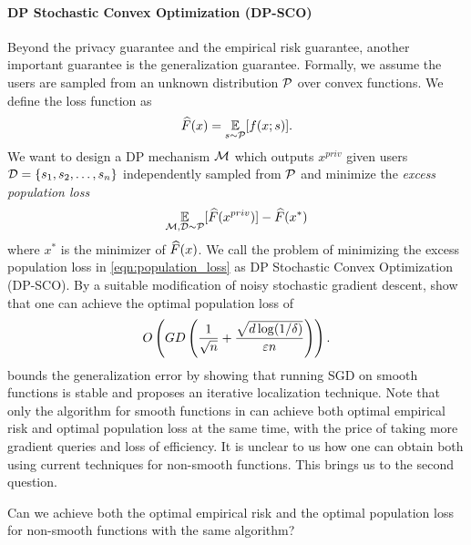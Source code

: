 \paragraph{DP Stochastic Convex Optimization (DP-SCO)} Beyond the privacy guarantee and the empirical risk guarantee, another important guarantee is the generalization guarantee. Formally, we assume the users are sampled from an unknown distribution $\mathcal P$ over convex functions. We define the loss function as
\begin{align}
\label{eq:DPSCO}
    \widehat{F}(x)=\operatorname*{\mathbb{E}}_{s\sim \mathcal P}[f(x;s)].
\end{align}
We want to design a DP mechanism $\mathcal M$ which outputs $x^{priv}$ given users $\mathcal D = \{s_1,s_2,\dots,s_n\}$ independently sampled from $\mathcal P$ and minimize the \emph{excess population loss}
\begin{equation}
\label{eqn:population_loss}
    \operatorname*{\mathbb{E}}_{\mathcal M,\mathcal D\sim \mathcal P}[\widehat{F}(x^{priv})] - \widehat{F}(x^*)
\end{equation}
where $x^*$ is the minimizer of $\widehat{F}(x)$. We call the problem of minimizing the excess population loss in \eqref{eqn:population_loss} as DP Stochastic Convex Optimization (DP-SCO).
By a suitable modification of noisy stochastic gradient descent, \cite{bftt19,FKT20} show that one can achieve the optimal population loss of
\begin{equation}
\label{eqn:optimal_population_loss}
O\left( GD \left(\frac{1}{\sqrt{n}}+\frac{\sqrt{d\log(1/\delta)}}{\varepsilon n}\right)\right).
\end{equation}
\cite{bftt19} bounds the generalization error by showing that running SGD on smooth functions is stable and \cite{FKT20} proposes an iterative localization technique.
Note that only the algorithm for smooth functions in \cite{bftt19} can achieve both optimal empirical risk and optimal population loss at the same time, with the price of taking more gradient queries and loss of efficiency.
It is unclear to us how one can obtain both using current techniques for non-smooth functions.
This brings us to the second question. 
\begin{question}
Can we achieve both the optimal empirical risk and the optimal population loss for non-smooth functions with the same algorithm?
\end{question}

